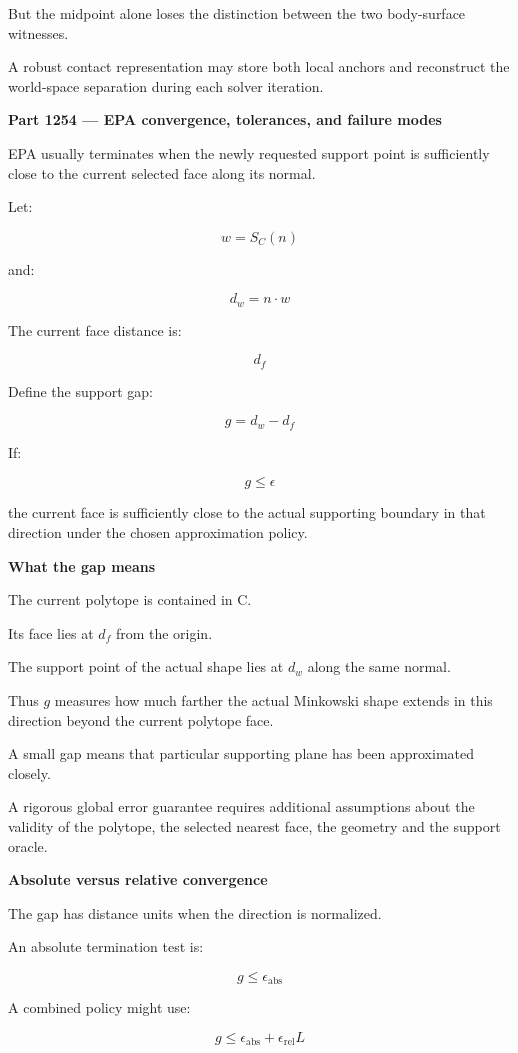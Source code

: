 But the midpoint alone loses the distinction between the two body-surface witnesses.

A robust contact representation may store both local anchors and reconstruct the world-space separation during each solver iteration.

\textbf{Part 1254 --- EPA convergence, tolerances, and failure modes}

EPA usually terminates when the newly requested support point is sufficiently close to the current selected face along its normal.

Let:

\[
w=S_C(n)
\]

and:

\[
d_w=n\cdot w
\]

The current face distance is:

\[
d_f
\]

Define the support gap:

\[
\boxed{ g=d_w-d_f }
\]

If:

\[
g\le\epsilon
\]

the current face is sufficiently close to the actual supporting boundary in that direction under the chosen approximation policy.

\textbf{What the gap means}

The current polytope is contained in C.

Its face lies at \(d_f\) from the origin.

The support point of the actual shape lies at \(d_w\) along the same normal.

Thus \(g\) measures how much farther the actual Minkowski shape extends in this direction beyond the current polytope face.

A small gap means that particular supporting plane has been approximated closely.

A rigorous global error guarantee requires additional assumptions about the validity of the polytope, the selected nearest face, the geometry and the support oracle.

\textbf{Absolute versus relative convergence}

The gap has distance units when the direction is normalized.

An absolute termination test is:

\[
g\le\epsilon_{\mathrm{abs}}
\]

A combined policy might use:

\[
\boxed{ g\le\epsilon_{\mathrm{abs}} + \epsilon_{\mathrm{rel}}L }
\]

